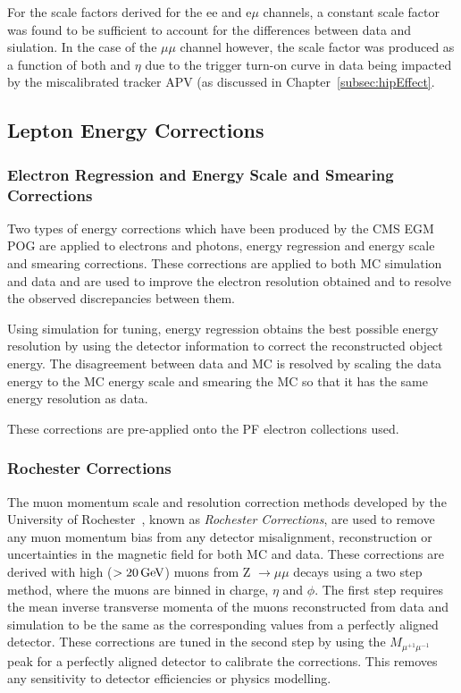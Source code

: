 For the scale factors derived for the ee and e$\mu$ channels, a constant scale factor was found to be sufficient to account for the differences between data and siulation.
In the case of the $\mu\mu$ channel however, the scale factor was produced as a function of both \pt and $\eta$ due to the trigger turn-on curve in data being impacted by the miscalibrated tracker APV (as discussed in Chapter~\ref{subsec:hipEffect}.

\subsection{Lepton Energy Corrections}\label{subsec:leptonEnergyCorrections}
\subsubsection{Electron Regression and Energy Scale and Smearing Corrections}
Two types of energy corrections which have been produced by the CMS EGM POG are applied to electrons and photons, energy regression and energy scale and smearing corrections.
These corrections are applied to both MC simulation and data and are used to improve the electron resolution obtained and to resolve the observed discrepancies between them.

Using simulation for tuning, energy regression obtains the best possible energy resolution by using the detector information to correct the reconstructed object energy.
The disagreement between data and MC is resolved by scaling the data energy to the MC energy scale and smearing the MC so that it has the same energy resolution as data. 

These corrections are pre-applied onto the PF electron collections used.

\subsubsection{Rochester Corrections}
The muon momentum scale and resolution correction methods developed by the University of Rochester~\cite{rochester}, known as \emph{Rochester Corrections}, are used to remove any muon momentum bias from any detector misalignment, reconstruction or uncertainties in the magnetic field for both MC and data.
These corrections are derived with high \pt ($> 20\,\text{Ge\hspace{-.08em}V}$) muons from Z $ \rightarrow \mu\mu$ decays using a two step method, where the muons are binned in charge, $\eta$ and $\phi$.
The first step requires the mean inverse transverse momenta of the muons reconstructed from data and simulation to be the same as the corresponding values from a perfectly aligned detector.
These corrections are tuned in the second step by using the $M_{\mu^{+1}\mu^{-1}}$ peak for a perfectly aligned detector to calibrate the corrections.
This removes any sensitivity to detector efficiencies or physics modelling.

